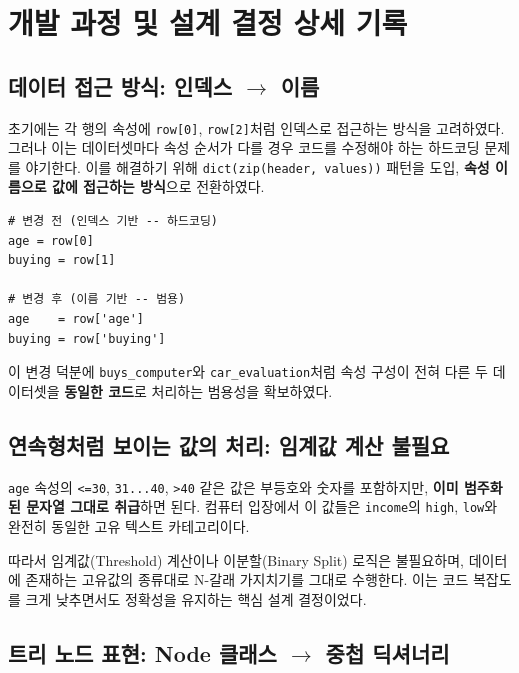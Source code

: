 \documentclass[12pt, a4paper]{article}
\begin{document}
\section{개발 과정 및 설계 결정 상세 기록}

\subsection{데이터 접근 방식: 인덱스 $\to$ 이름}

초기에는 각 행의 속성에 \texttt{row[0]}, \texttt{row[2]}처럼 인덱스로 접근하는 방식을 고려하였다. 그러나 이는 데이터셋마다 속성 순서가 다를 경우 코드를 수정해야 하는 하드코딩 문제를 야기한다. 이를 해결하기 위해 \texttt{dict(zip(header, values))} 패턴을 도입, \textbf{속성 이름으로 값에 접근하는 방식}으로 전환하였다.

\begin{verbatim}
# 변경 전 (인덱스 기반 -- 하드코딩)
age = row[0]
buying = row[1]

# 변경 후 (이름 기반 -- 범용)
age    = row['age']
buying = row['buying']
\end{verbatim}

이 변경 덕분에 \texttt{buys\_computer}와 \texttt{car\_evaluation}처럼 속성 구성이 전혀 다른 두 데이터셋을 \textbf{동일한 코드}로 처리하는 범용성을 확보하였다.


\subsection{연속형처럼 보이는 값의 처리: 임계값 계산 불필요}

\texttt{age} 속성의 \texttt{<=30}, \texttt{31...40}, \texttt{>40} 같은 값은 부등호와 숫자를 포함하지만, \textbf{이미 범주화된 문자열 그대로 취급}하면 된다. 컴퓨터 입장에서 이 값들은 \texttt{income}의 \texttt{high}, \texttt{low}와 완전히 동일한 고유 텍스트 카테고리이다.

따라서 임계값(Threshold) 계산이나 이분할(Binary Split) 로직은 불필요하며, 데이터에 존재하는 고유값의 종류대로 N-갈래 가지치기를 그대로 수행한다. 이는 코드 복잡도를 크게 낮추면서도 정확성을 유지하는 핵심 설계 결정이었다.


\subsection{트리 노드 표현: Node 클래스 $\to$ 중첩 딕셔너리}
\end{document}
